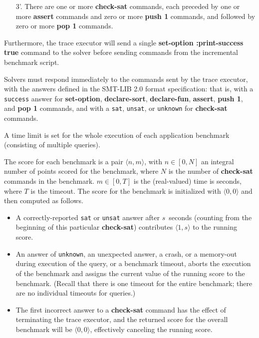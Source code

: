 \documentclass[12pt]{article}
\newcommand{\akey}[1]{\textbf{#1}}
\begin{document}
\begin{enumerate}
\item[3'.] There are one or more \akey{check-sat} commands, 
  each preceded by one or more \akey{assert} commands 
  and zero or more \akey{push 1} commands, 
  and followed by zero or more \akey{pop 1} commands.
\end{enumerate}

\noindent
Furthermore, the trace executor will send a single 
\akey{set-option :print-success true} command to the solver before 
sending commands from the incremental benchmark script.

\medskip
Solvers must respond immediately to the commands sent by the trace executor, 
with the answers defined in the SMT-LIB 2.0 format specification: that is,
with a \texttt{success} answer for 
\akey{set-option}, 
\akey{declare-sort}, 
\akey{declare-fun}, 
\akey{assert}, 
\akey{push 1}, 
and \akey{pop 1} 
commands,
and with a \texttt{sat}, \texttt{unsat}, or \texttt{unknown} 
for \akey{check-sat} commands.

A time limit is set for the whole execution of each application
benchmark (consisting of multiple queries).

The score for each benchmark is a pair $\langle n,m\rangle$, with
$n\in[0,N]$ an integral number of points scored for the benchmark,
where $N$ is the number of \akey{check-sat} commands
in the benchmark.  $m\in[0,T]$ is the (real-valued) time is seconds, where $T$ is
the timeout.  The score for the benchmark is initialized with
$\langle0,0\rangle$ and then computed as follows.
\begin{itemize}
\item A correctly-reported \texttt{sat} or \texttt{unsat} answer after
  $s$~seconds (counting from the beginning of this particular
  \akey{check-sat}) contributes $\langle1,s\rangle$ to the running
  score.
\item An answer of \texttt{unknown}, an unexpected answer, a crash, or a memory-out during
  execution of the query, or a benchmark timeout, aborts the execution
  of the benchmark and assigns the current value of the running score
  to the benchmark.  (Recall that there is one timeout for the entire
  benchmark; there are no individual timeouts for queries.)
\item The first incorrect answer to a \akey{check-sat} command has the effect of terminating the
  trace executor, and the returned score for the overall benchmark
  will be $\langle0,0\rangle$, effectively canceling the running score.
\end{itemize}
\end{document}
